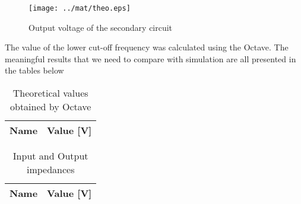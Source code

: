 \begin{figure}[H] \centering
\texttt{[image: ../mat/theo.eps]}
\caption{Output voltage of the secondary circuit}
\label{fig:mat2}
\end{figure}

The value of the lower cut-off frequency was calculated using the Octave. The meaningful results that we need to compare with simulation are all presented in the tables below

\begin{table}[H]
  \centering
  \begin{tabular}{|l|r|}
    \hline    
    {\bf Name} & {\bf Value [V]} \\ \hline
    
  \end{tabular}
  \caption{Theoretical values obtained by Octave}
  \label{tab:mat3}
\end{table}


\begin{table}[H]
  \centering
  \begin{tabular}{|l|r|}
    \hline    
    {\bf Name} & {\bf Value [V]} \\ \hline
    
  \end{tabular}
  \caption{Input and Output impedances}
  \label{tab:mat7}
\end{table}



